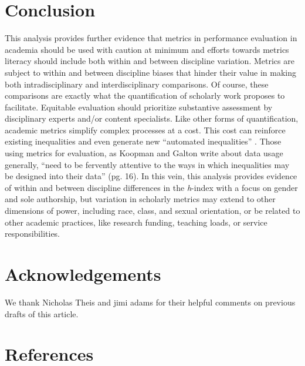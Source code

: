 \documentclass[
  10pt,
  letterpaper,
]{article}
\begin{document}
\section{Conclusion}\label{conclusion}

This analysis provides further evidence that metrics in performance
evaluation in academia should be used with caution at minimum and
efforts towards metrics literacy should include both within and between
discipline variation. Metrics are subject to within and between
discipline biases that hinder their value in making both
intradisciplinary and interdisciplinary comparisons. Of course, these
comparisons are exactly what the quantification of scholarly work
proposes to facilitate. Equitable evaluation should prioritize
substantive assessment by disciplinary experts and/or content
specialists. Like other forms of quantification, academic metrics
simplify complex processes at a cost. This cost can reinforce existing
inequalities and even generate new ``automated inequalities''
\citep{eubanks_automating_2018}. Those using metrics for evaluation, as
Koopman and Galton \citep{koopman_galton_2023} write about data usage
generally, ``need to be fervently attentive to the ways in which
inequalities may be designed into their data'' (pg. 16). In this vein,
this analysis provides evidence of within and between discipline
differences in the \emph{h}-index with a focus on gender and sole
authorship, but variation in scholarly metrics may extend to other
dimensions of power, including race, class, and sexual orientation, or
be related to other academic practices, like research funding, teaching
loads, or service responsibilities.

\section{Acknowledgements}\label{acknowledgements}

We thank Nicholas Theis and jimi adams for their helpful comments on
previous drafts of this article.

\section{References}\label{references}
\end{document}
